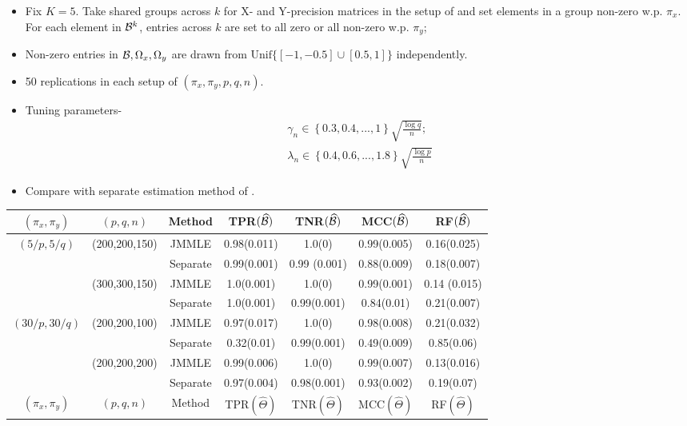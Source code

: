 \documentclass[landscape,a0paper,fontscale=0.4]{baposter} %
\newcommand{\compresslist}{ %
\setlength{\itemsep}{1pt}
\setlength{\parskip}{0pt}
\setlength{\parsep}{0pt}
}
\begin{document}
\begin{poster}
{\parbox{.39\textwidth}{
\begin{itemize}[leftmargin=*]\compresslist
\item Fix $K=5$. Take shared groups across $k$ for X- and Y-precision matrices in the setup of \cite{MaMichailidis15} and set elements in a group non-zero w.p. $\pi_x$. For each element in ${\cal{B}}^k$, entries across $k$ are set to all zero or all non-zero w.p. $\pi_y$;

\item Non-zero entries in ${\cal{B}},\Omega_x,\Omega_y$ are drawn from $\text{Unif}\{ [ -1, -0.5] \cup [0.5,1]\}$ independently.

\item 50 replications in each setup of $(\pi_x, \pi_y, p, q, n)$.

\item Tuning parameters-
%
\vspace{-.5em}
\begin{align*}
\gamma_n \in \left\{ 0.3, 0.4, ..., 1 \right\} \sqrt{\frac{\log q}{n}};\\
\lambda_n \in \left\{ 0.4, 0.6, ..., 1.8 \right\} \sqrt{\frac{\log p}{n}}
\end{align*}

\item Compare with separate estimation method of \cite{LinEtal16}.
\end{itemize}
}
%
\parbox{.59\textwidth}{
\centering
\fontsize{9}{10}
\selectfont
\begin{tabular}{ccccccc}
\hline
    $(\pi_x, \pi_y)$ & $(p,q,n)$   & Method   & TPR$(\widehat {{\cal{B}}})$            & TNR$(\widehat {{\cal{B}}})$             & MCC$(\widehat {{\cal{B}}})$ & RF$(\widehat {{\cal{B}}})$    \\ \hline
$(5/p, 5/q)$       & (200,200,150) & JMMLE    & 0.98(0.011) & 1.0(0)       & 0.99(0.005) & 0.16(0.025) \\
    ~              & ~             & Separate & 0.99(0.001) & 0.99 (0.001) & 0.88(0.009) & 0.18(0.007) \\\cline{2-7}
    ~              & (300,300,150) & JMMLE    & 1.0(0.001)  & 1.0(0)       & 0.99(0.001) & 0.14 (0.015)\\
    ~              & ~             & Separate & 1.0(0.001)  & 0.99(0.001)  & 0.84(0.01)  & 0.21(0.007)\\\hline
    $(30/p, 30/q)$ & (200,200,100) & JMMLE    & 0.97(0.017) & 1.0(0)       & 0.98(0.008) & 0.21(0.032) \\
    ~              & ~             & Separate & 0.32(0.01)  & 0.99(0.001)  & 0.49(0.009) & 0.85(0.06)  \\\cline{2-7}
    ~              & (200,200,200) & JMMLE    & 0.99(0.006) & 1.0(0)       & 0.99(0.007) & 0.13(0.016) \\
    ~              & ~             & Separate & 0.97(0.004) & 0.98(0.001)  & 0.93(0.002) & 0.19(0.07)  \\    \hline
\hline
$(\pi_x, \pi_y)$ & $(p,q,n)$   & Method   & TPR$(\widehat \Theta)$            & TNR$(\widehat \Theta)$             & MCC$(\widehat \Theta)$ & RF$(\widehat \Theta)$    \\ \hline


\end{tabular}}}
\end{poster}
\end{document}
